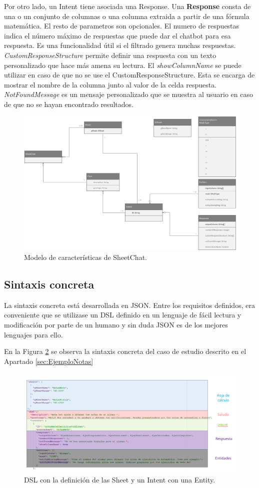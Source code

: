 Por otro lado, un Intent tiene asociada una Response. Una \textbf{Response} consta de una o un conjunto de columnas o una columna extraida a partir de una fórmula matemática. El resto de parametros son opcionales. El numero de respuestas indica el número máximo de respuestas que puede dar el chatbot para esa respuesta. Es una funcionalidad útil si el filtrado genera muchas respuestas. \emph{CustomResponseStructure} permite definir una respuesta con un texto personalizado que hace más amena su lectura. El \emph{showColumnName} se puede utilizar en caso de que no se use el CustomResponseStructure. Esta se encarga de mostrar el nombre de la columna junto al valor de la celda respuesta. \emph{NotFoundMessage} es un mensaje personalizado que se muestra al usuario en caso de que no se hayan encontrado resultados.

\begin{figure}[htb]
	\centering
	\includegraphics[width=1.1\textwidth]{./figs/Metamodel.png}
	\caption{Modelo de características de SheetChat.}
	\label{fig:Metamodel}
\end{figure}

\subsection{Sintaxis concreta}
\label{sec:ConcreteSyntax}

La sintaxis concreta está desarrollada en JSON. Entre los requisitos definidos, era conveniente que se utilizase un DSL definido en un lenguaje de fácil lectura y modificación por parte de un humano y sin duda JSON es de los mejores lenguajes para ello.

En la Figura \ref{fig:ConcreteSyntax} se observa la sintaxis concreta del caso de estudio descrito en el Apartado \ref{sec:EjemploNotas}

\begin{figure}[htb]
	\centering
	\includegraphics[width=1.1\textwidth]{./figs/DSLNotas.png}
	\caption{DSL con la definición de las Sheet y un Intent con una Entity.}
	\label{fig:ConcreteSyntax}
\end{figure}
